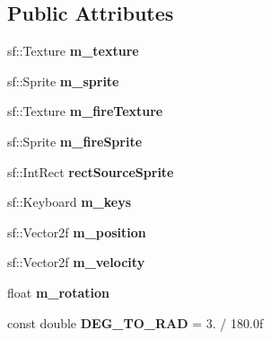 \subsection*{Public Attributes}
\begin{DoxyCompactItemize}
\item 
\mbox{\label{class_player_a032cc077cd941af92b185e147eb6fb76}} 
sf\+::\+Texture {\bfseries m\+\_\+texture}
\item 
\mbox{\label{class_player_acea3e1bbd92be7a0fbf26764ec919b24}} 
sf\+::\+Sprite {\bfseries m\+\_\+sprite}
\item 
\mbox{\label{class_player_aec8244110adf5ff83ced33ad7bdf57ca}} 
sf\+::\+Texture {\bfseries m\+\_\+fire\+Texture}
\item 
\mbox{\label{class_player_a7246482478b3588f21dcbed594bd66f4}} 
sf\+::\+Sprite {\bfseries m\+\_\+fire\+Sprite}
\item 
\mbox{\label{class_player_a006c74cd504c536692449dfbc4316907}} 
sf\+::\+Int\+Rect {\bfseries rect\+Source\+Sprite}
\item 
\mbox{\label{class_player_aeeec37f6097605b0b5988ed0c18e5992}} 
sf\+::\+Keyboard {\bfseries m\+\_\+keys}
\item 
\mbox{\label{class_player_a36aa39fc04866810640a5e361b8c8246}} 
sf\+::\+Vector2f {\bfseries m\+\_\+position}
\item 
\mbox{\label{class_player_a59323f7c0100a4b82ae0fa149ebddad7}} 
sf\+::\+Vector2f {\bfseries m\+\_\+velocity}
\item 
\mbox{\label{class_player_acd5f8e9953ff8d643954f425e2a0b197}} 
float {\bfseries m\+\_\+rotation}
\item 
\mbox{\label{class_player_abc6d43f4c31a2bfc1f3aafeec71b56ee}} 
const double {\bfseries D\+E\+G\+\_\+\+T\+O\+\_\+\+R\+AD} = 3. / 180.\+0f
\item 
\mbox{\label{class_player_ac872b310930295033b218f1551a27e34}} 

\end{DoxyCompactItemize}
